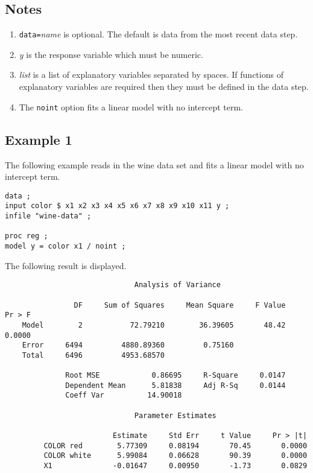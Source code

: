 \documentclass[12pt]{article}
\begin{document}
\subsection*{Notes}

\begin{enumerate}
\item
{\tt data=}{\it name} is optional.
The default is data from the most recent data step.
\item
{\it y} is the response variable which must be numeric.
\item
{\it list} is a list of explanatory variables separated by spaces.
If functions of explanatory variables are required then
they must be defined in the data step.
\item
The {\tt noint} option fits a linear model with no intercept term.
\end{enumerate}

\subsection*{Example 1}

The following example reads in the wine data set and fits
a linear model with no intercept term.

{\scriptsize\begin{verbatim}
data ;
input color $ x1 x2 x3 x4 x5 x6 x7 x8 x9 x10 x11 y ;
infile "wine-data" ;

proc reg ;
model y = color x1 / noint ;
\end{verbatim}}

The following result is displayed.

{\scriptsize\begin{verbatim}
                              Analysis of Variance

                DF     Sum of Squares     Mean Square     F Value     Pr > F
    Model        2           72.79210        36.39605       48.42     0.0000
    Error     6494         4880.89360         0.75160                       
    Total     6496         4953.68570                                       

              Root MSE            0.86695     R-Square     0.0147
              Dependent Mean      5.81838     Adj R-Sq     0.0144
              Coeff Var          14.90018                        

                              Parameter Estimates

                         Estimate     Std Err     t Value     Pr > |t|
         COLOR red        5.77309     0.08194       70.45       0.0000
         COLOR white      5.99084     0.06628       90.39       0.0000
         X1              -0.01647     0.00950       -1.73       0.0829
\end{verbatim}}
\end{document}
